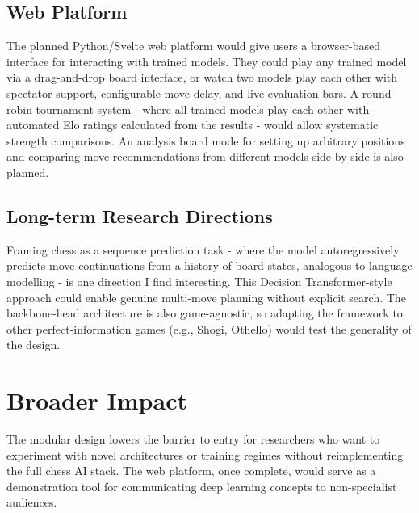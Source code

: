 
\subsection{Web Platform}

The planned Python/Svelte web platform would give users a browser-based interface for interacting with trained models. They could play any trained model via a drag-and-drop board interface, or watch two models play each other with spectator support, configurable move delay, and live evaluation bars. A round-robin tournament system - where all trained models play each other with automated Elo ratings calculated from the results - would allow systematic strength comparisons. An analysis board mode for setting up arbitrary positions and comparing move recommendations from different models side by side is also planned.

\subsection{Long-term Research Directions}

Framing chess as a sequence prediction task - where the model autoregressively predicts move continuations from a history of board states, analogous to language modelling - is one direction I find interesting. This Decision Transformer-style approach could enable genuine multi-move planning without explicit search. The backbone-head architecture is also game-agnostic, so adapting the framework to other perfect-information games (e.g., Shogi, Othello) would test the generality of the design.


\section{Broader Impact}

The modular design lowers the barrier to entry for researchers who want to experiment with novel architectures or training regimes without reimplementing the full chess AI stack. The web platform, once complete, would serve as a demonstration tool for communicating deep learning concepts to non-specialist audiences.
